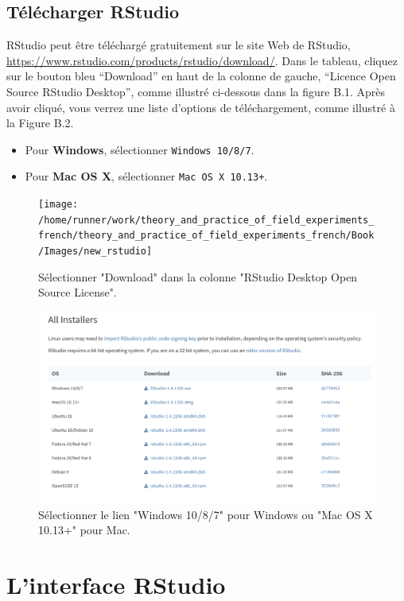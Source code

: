 \documentclass[12pt,]{book}
\providecommand{\tightlist}{%
  \setlength{\itemsep}{0pt}\setlength{\parskip}{0pt}}
\begin{document}
\hypertarget{tuxe9luxe9charger-rstudio}{%
\subsection{Télécharger RStudio}\label{tuxe9luxe9charger-rstudio}}

RStudio peut être téléchargé gratuitement sur le site Web de RStudio, \url{https://www.rstudio.com/products/rstudio/download/}. Dans le tableau, cliquez sur le bouton bleu ``Download'' en haut de la colonne de gauche, ``Licence Open Source RStudio Desktop'', comme illustré ci-dessous dans la figure B.1. Après avoir cliqué, vous verrez une liste d'options de téléchargement, comme illustré à la Figure B.2.

\begin{itemize}
\tightlist
\item
  Pour \textbf{Windows}, sélectionner \texttt{Windows\ 10/8/7}.
\item
  Pour \textbf{Mac OS X}, sélectionner \texttt{Mac\ OS\ X\ 10.13+}.
\end{itemize}

\begin{figure}
\texttt{[image: /home/runner/work/theory\_and\_practice\_of\_field\_experiments\_french/theory\_and\_practice\_of\_field\_experiments\_french/Book/Images/new\_rstudio]} \caption{Sélectionner "Download" dans la colonne "RStudio Desktop Open Source License".}\label{fig:rstudiopng}
\end{figure}

\begin{figure}
\includegraphics[width=0.8\linewidth]{Images/rstudio_download} \caption{Sélectionner le lien "Windows 10/8/7" pour Windows ou "Mac OS X 10.13+" pour Mac.}\label{fig:rstudiodownload}
\end{figure}

\hypertarget{linterface-rstudio}{%
\section{L'interface RStudio}\label{linterface-rstudio}}
\end{document}

